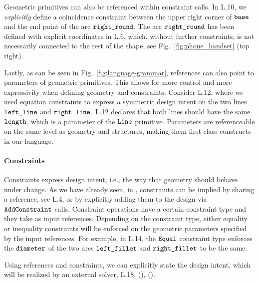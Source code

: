 Geometric primitives can also be referenced within constraint calls.
In L.10, we \emph{explicitly} define a coincidence constraint between the upper right corner of $\verb|base|$ and the end point of the arc $\verb|right_round|$.
The arc $\verb|right_round|$ has been defined with explicit coordinates in L.6, which, without further constraints, is not necessarily connected to the rest of the shape, see Fig.~\ref{fig:phone_handset} (top right).

Lastly, as can be seen in Fig.~\ref{fig:language-grammar}, references can also point to parameters of geometric primitives.
This allows for more control and more expressivity when defining geometry and constraints.
Consider L.12, where we used equation constraints to express a symmetric design intent on the two lines $\verb|left_line|$ and $\verb|right_line|$.
L.12 declares that both lines should have the same $\verb|length|$, which is a parameter of the $\verb|Line|$ primitive.
Parameters are referenceable on the same level as geometry and structures, making them first-class constructs in our language.

\paragraph{Constraints}
Constraints express design intent, i.e., the way that geometry should behave under change.
As we have already seen, in \langname{}, constraints can be implied by sharing a reference, see L.4, or by explicitly adding them to the design via $\verb|AddConstraint|$ calls.
Constraint operations have a certain constraint type and they take as input references.
Depending on the constraint type, either equality or inequality constraints will be enforced on the geometric parameters specified by the input references.
For example, in L.14, the $\verb|Equal|$ constraint type enforces the $\verb|diameter|$ of the two arcs $\verb|left_fillet|$ and $\verb|right_fillet|$ to be the same.

Using references and constraints, we can explicitly state the design intent, which will be realized by an external solver, L.18, (\dgone{}), (\dgtwo{}).

